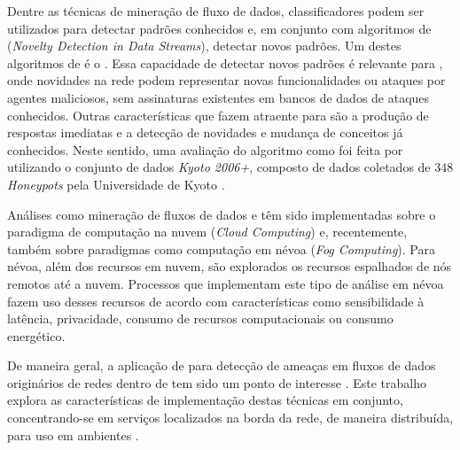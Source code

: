 
Dentre as técnicas de mineração de fluxo de dados, classificadores podem ser
utilizados para detectar padrões conhecidos e, em conjunto com algoritmos de
\nd (\emph{Novelty Detection in Data Streams}), detectar novos padrões.
Um destes algoritmos de \nd é o \minas \cite{Faria2013Minas}.
Essa capacidade de detectar novos padrões é relevante para \nids, onde novidades
na rede podem representar novas funcionalidades ou ataques por agentes
maliciosos, sem assinaturas existentes em bancos de dados de ataques conhecidos.
Outras características que fazem \nd atraente para \nids são a produção de
respostas imediatas e a detecção de novidades e mudança de conceitos já
conhecidos.
Neste sentido, uma avaliação do algoritmo \minas como \nids foi feita por
 utilizando o conjunto de dados \emph{Kyoto 2006+},
composto de dados coletados de 348 \emph{Honeypots} pela Universidade de Kyoto
\cite{KyotoDataset}.

Análises como mineração de fluxos de dados e \nd têm sido implementadas sobre
o paradigma de computação na nuvem (\emph{Cloud Computing}) e, recentemente,
também sobre paradigmas como computação em névoa (\emph{Fog Computing}).
Para névoa, além dos recursos em nuvem, são explorados os recursos
espalhados de nós remotos até a nuvem.
Processos que implementam este tipo de análise em névoa fazem uso desses
recursos de acordo com características como sensibilidade à latência,
privacidade, consumo de recursos computacionais ou consumo energético.

De maneira geral, a aplicação de \nd para detecção de ameaças em fluxos de dados
originários de redes \iot dentro de \nids tem sido um ponto de interesse
\cite{Viegas2019,Lopez2019,DaCosta2019a}.
Este trabalho explora as características de implementação destas técnicas
em conjunto, concentrando-se em serviços localizados na borda da rede, de maneira
distribuída, para uso em ambientes \iot.


